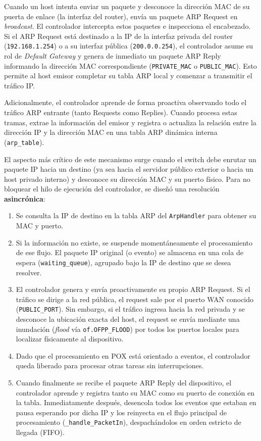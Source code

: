 \documentclass[11pt, a4paper]{article}
\begin{document}
Cuando un host intenta enviar un paquete y desconoce la dirección MAC de su puerta de enlace (la interfaz del router), envía un paquete ARP Request en \textit{broadcast}. El controlador intercepta estos paquetes e inspecciona el encabezado. Si el ARP Request está destinado a la IP de la interfaz privada del router (\texttt{192.168.1.254}) o a su interfaz pública (\texttt{200.0.0.254}), el controlador asume su rol de \textit{Default Gateway} y genera de inmediato un paquete ARP Reply informando la dirección MAC correspondiente (\texttt{PRIVATE\_MAC} o \texttt{PUBLIC\_MAC}). Esto permite al host emisor completar su tabla ARP local y comenzar a transmitir el tráfico IP.

Adicionalmente, el controlador aprende de forma proactiva observando todo el tráfico ARP entrante (tanto Requests como Replies). Cuando procesa estas tramas, extrae la información del emisor y registra o actualiza la relación entre la dirección IP y la dirección MAC en una tabla ARP dinámica interna (\texttt{arp\_table}).

El aspecto más crítico de este mecanismo surge cuando el switch debe enrutar un paquete IP hacia un destino (ya sea hacia el servidor público exterior o hacia un host privado interno) y desconoce su dirección MAC y su puerto físico. Para no bloquear el hilo de ejecución del controlador, se diseñó una resolución \textbf{asincrónica}:
\begin{enumerate}
    \item Se consulta la IP de destino en la tabla ARP del \texttt{ArpHandler} para obtener su MAC y puerto.
    \item Si la información no existe, se suspende momentáneamente el procesamiento de ese flujo. El paquete IP original (o evento) se almacena en una cola de espera (\texttt{waiting\_queue}), agrupado bajo la IP de destino que se desea resolver.
    \item El controlador genera y envía proactivamente su propio ARP Request. Si el tráfico se dirige a la red pública, el request sale por el puerto WAN conocido (\texttt{PUBLIC\_PORT}). Sin embargo, si el tráfico ingresa hacia la red privada y se desconoce la ubicación exacta del host, el request se envía mediante una inundación (\textit{flood} vía \texttt{of.OFPP\_FLOOD}) por todos los puertos locales para localizar físicamente al dispositivo.
    \item Dado que el procesamiento en POX está orientado a eventos, el controlador queda liberado para procesar otras tareas sin interrupciones.
    \item Cuando finalmente se recibe el paquete ARP Reply del dispositivo, el controlador aprende y registra tanto su MAC como su puerto de conexión en la tabla. Inmediatamente después, desencola todos los eventos que estaban en pausa esperando por dicha IP y los reinyecta en el flujo principal de procesamiento (\texttt{\_handle\_PacketIn}), despachándolos en orden estricto de llegada (FIFO).
\end{enumerate}
\end{document}
